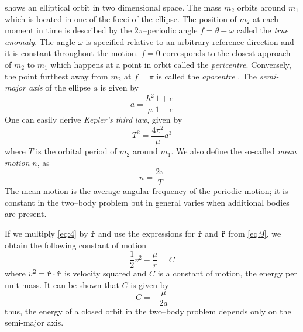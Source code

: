 \documentclass[ twoside,openright,titlepage,numbers=noenddot,headinclude,%
                footinclude=true,cleardoublepage=empty,abstractoff, %
                BCOR=5mm,paper=a4,fontsize=11pt,%
                american,%
                ]{scrreprt}
\begin{document}
 shows an elliptical orbit in two dimensional space. The mass
$m_2$ orbits around $m_1$ which is located in one of the focci of the ellipse.
The position of $m_2$ at each moment in time is described by the $2\pi$--periodic
angle 
$f=\theta - \omega$ called the \emph{true anomaly}. The angle $\omega$ is specified 
relative to an arbitrary reference direction and it is constant throughout the 
motion. $f=0$ corresponds to the closest approach of $m_2$ to $m_1$ which 
happens at a point in orbit called 
the \emph{pericentre}. Conversely, the point furthest away from 
$m_2$ at $f=\pi$ is called the \emph{apocentre} . 
The \emph{semi-major axis} of the ellipse $a$ is given by
\begin{equation}
    a= \frac{h^2}{\mu} \frac{1+e}{1-e} 
\end{equation}
One can easily derive \citep[ex.][]{murray} \emph{Kepler's third law}, given by
\begin{equation}
    T^2= \frac{4\pi^2}{\mu} a^3
    \label{eq:kepler_law}
\end{equation}
where $T$ is the orbital period of $m_2$ around $m_1$. We also define the so-called
\emph{mean motion} $n$, as
\begin{equation}
    n= \frac{2\pi}{T} 
\end{equation}
The mean motion is the average angular frequency of the periodic motion; it is 
constant in the two--body problem but in general varies when additional bodies are 
present.

If we multiply \cref{eq:4} by $\dot{\boldsymbol{\mathbf{r}}}$ and use the expressions for
$\dot{\boldsymbol{\mathbf{r}}}$ and $\ddot{\boldsymbol{\mathbf{r}}}$ from \cref{eq:9}, we obtain the following
constant of motion
\begin{equation}
    \frac{1}{2} v^2 - \frac{\mu}{r} =C
\end{equation}
where $v^2=\dot{\boldsymbol{\mathbf{r}}}\cdot\dot{\boldsymbol{\mathbf{r}}}$ is velocity squared and $C$ is a
constant of motion, the energy per unit mass. It can be shown \citep{murray}
that $C$ is given by
\begin{equation}
    C= -\frac{\mu}{2a} 
\end{equation}
thus, the energy of a closed orbit in the two--body problem depends only on the semi-major axis.
\end{document}
